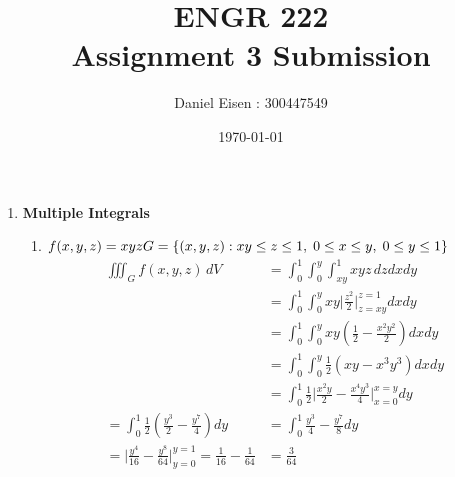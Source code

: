 \documentclass[11pt]{article}
\title{ENGR 222 \\ Assignment 3 Submission}
\author{Daniel Eisen : 300447549}
\date{\today}
\begin{document}
\begin{preview}

  \maketitle

  \begin{enumerate}
    \item \textbf{Multiple Integrals}
          \begin{enumerate}
            \item $f(x,y,z)=xyz \\ G=\{(x,y,z) : xy \le z \le 1,\; 0 \le x \le y,\; 0 \le y \le 1\}$
                  \begin{align*}
                    \iiint_{G} f(x,y,z) \,dV                                                                  & = \int_{0}^{1}\int_{0}^{y}\int_{xy}^{1} xyz \, dz dx dy                                  \\
                                                                                                              & = \int_{0}^{1}\int_{0}^{y}xy\Big| \frac{z^{2}}{2} \Big|_{z=xy}^{z=1} dx dy               \\
                                                                                                              & = \int_{0}^{1}\int_{0}^{y}xy\left( \frac{1}{2} - \frac{x^{2}y^{2}}{2} \right) dx dy      \\
                                                                                                              & = \int_{0}^{1}\int_{0}^{y} \frac{1}{2}(xy-x^{3}y^{3}) dx dy                              \\
                                                                                                              & = \int_{0}^{1} \frac{1}{2} \Big|\frac{x^{2}y}{2}-\frac{x^{4}y^{3}}{4}\Big|_{x=0}^{x=y}dy \\
                    = \int_{0}^{1} \frac{1}{2} \left(\frac{y^{3}}{2}-\frac{y^{7}}{4}\right) dy                & =  \int_{0}^{1} \frac{y^{3}}{4}-\frac{y^{7}}{8} dy                                       \\
                    = \Big| \frac{y^{4}}{16} - \frac{y^8}{64} \Big|_{y=0}^{y=1} = \frac{1}{16} - \frac{1}{64} & = \frac{3}{64}                                                                           \\

\end{align*}
\end{enumerate}
\end{enumerate}
\end{preview}
\end{document}
